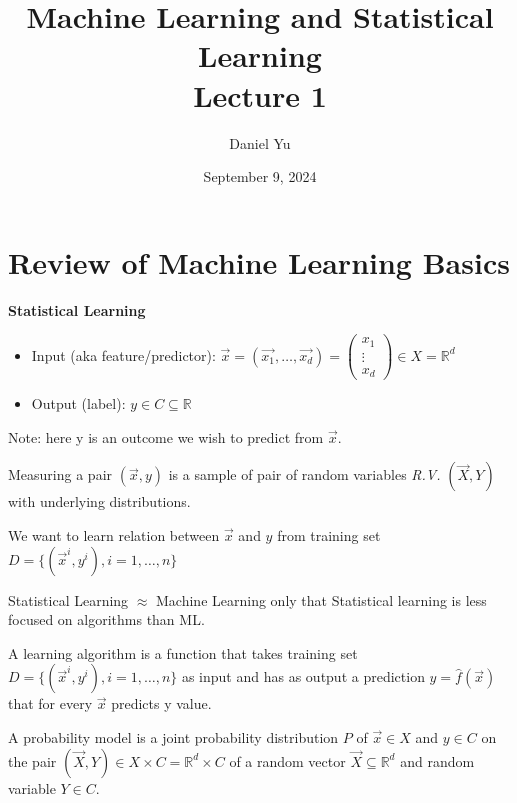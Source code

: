 \documentclass[a4paper]{article}
\author{\huge{Daniel Yu}}
\date{September 9, 2024}
\begin{document}
\title{\Huge{Machine Learning and Statistical Learning}\\ Lecture 1}
\maketitle
\newpage%
\tableofcontents
\pagebreak
  \section{Review of Machine Learning Basics}

  \textbf{Statistical Learning}
  \begin{itemize}
    \item Input (aka feature/predictor): $\vec{x} = (\vec{x_1}, \ldots, \vec{x_d}) = \begin{pmatrix} x_1\\ \vdots\\ x_d \end{pmatrix} \in X = \mathbb{R}^d$
    \item Output (label): $y \in C \subseteq \mathbb{R}$
  \end{itemize}

  Note: here y is an outcome we wish to predict from $\vec{x}$.
  
  \begin{remark}
    Measuring a pair $(\vec{x}, y)$ is a sample of pair of random variables \textit{R.V.} $(\vec{X}, Y)$ with underlying
    distributions.
  \end{remark}

  We want to learn relation between $\vec{x}$ and $y$ from training set $D = \{(\vec{x}^{i}, y^{i}), i = 1, \ldots, n \}$

  Statistical Learning $\approx$ Machine Learning only that Statistical learning is less focused on algorithms than ML.

  \begin{definition}
    A learning algorithm is a function that takes training set $D = \{(\vec{x}^{i}, y^{i}), i = 1, \ldots, n \}$ as input
    and has as output a prediction $y = \hat{f}(\vec{x})$ that for every $\vec{x}$ predicts y value.
  \end{definition}

  \begin{definition}
    A probability model is a joint probability distribution $P$ of $\vec{x} \in X$ and $y \in C$ on the pair $(\vec{X}, Y) \in X \times C = \mathbb{R}^d \times C$ 
    of a random vector $\vec{X} \subseteq \mathbb{R}^d$ and random variable $Y \in C$.
    
  \end{definition}
\end{document}
